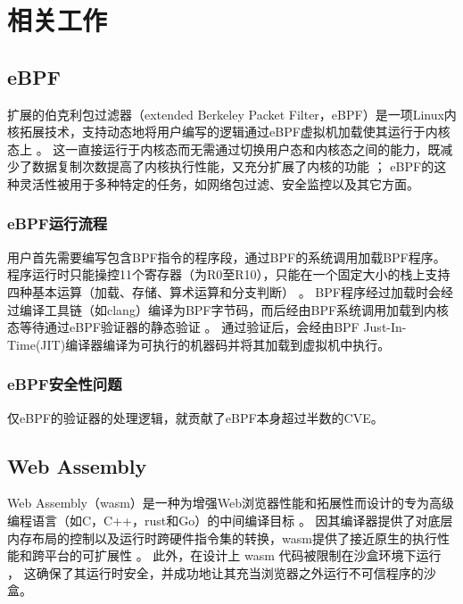 \section{相关工作}
\label{section:relatedWork}
\subsection{eBPF}
扩展的伯克利包过滤器（extended Berkeley Packet Filter，eBPF）是一项Linux内核拓展技术，支持动态地将用户编写的逻辑通过eBPF虚拟机加载使其运行于内核态上\nolinebreak
\cite{sunFindingCorrectnessBugs2024, YIHeCrossContainer}。\nolinebreak
这一直接运行于内核态而无需通过切换用户态和内核态之间的能力，既减少了数据复制次数提高了内核执行性能，又充分扩展了内核的功能\nolinebreak
\cite{YIHeCrossContainer, ZhangZiJunLinuxXiTonge}；\nolinebreak
eBPF的这种灵活性被用于多种特定的任务\cite{HaoValidating}，如网络包过滤\cite{10.1145/3371038}、安全监控\cite{9110434}以及其它方面\cite{280870, 258973}。\nolinebreak

\subsubsection{eBPF运行流程}
用户首先需要编写包含BPF指令的程序段，通过BPF的系统调用加载BPF程序。程序运行时只能操控11个寄存器（为R0至R10），只能在一个固定大小的栈上支持四种基本运算（加载、存储、算术运算和分支判断）\nolinebreak
\cite{HaoValidating}。\nolinebreak
BPF程序经过加载时会经过编译工具链（如clang）编译为BPF字节码，而后经由BPF系统调用加载到内核态等待通过eBPF验证器的静态验证\nolinebreak
\cite{zhengBpftimeUserspaceEBPF2023}。\nolinebreak
通过验证后，会经由BPF Just-In-Time(JIT)编译器编译为可执行的机器码并将其加载到虚拟机中执行。
\subsubsection{eBPF安全性问题}
仅eBPF的验证器的处理逻辑，就贡献了eBPF本身超过半数的CVE\cite{hive}。
\subsection{Web Assembly}
Web Assembly（wasm）是一种为增强Web浏览器性能和拓展性而设计的专为高级编程语言（如C，C++，rust和Go）的中间编译目标\nolinebreak
\cite{lehmannWasabiFrameworkDynamically2019, lehmannEverythingOldNew, bhansaliFirstLookCode2022, waseemIssuesTheirCauses2024}。\nolinebreak
因其编译器提供了对底层内存布局的控制以及运行时跨硬件指令集的转换，wasm提供了接近原生的执行性能和跨平台的可扩展性\nolinebreak
\cite{lehmannEverythingOldNew, waseemIssuesTheirCauses2024, lehmannWasabiFrameworkDynamically2019, JayProvablySafe}。\nolinebreak
此外，在设计上 wasm 代码被限制在沙盒环境下运行\nolinebreak
\cite{johnsonWaVeVerifiablySecure2023,WasmbpfStreamliningEBPF2024}，\nolinebreak
这确保了其运行时安全，并成功地让其充当浏览器之外运行不可信程序的沙盒\cite{narayanSwivelHardeningWebAssembly, WebAssemblySummaryOnSecurity}。


